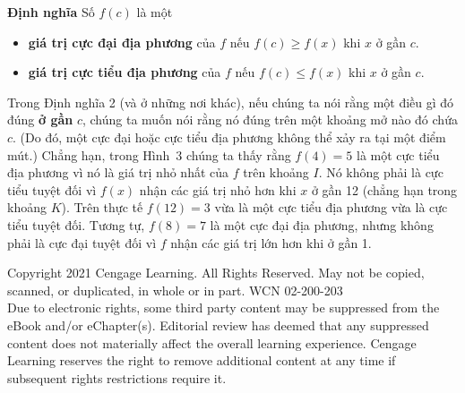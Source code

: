 \begin{minipage}[t]{131mm}
  \vspace{5pt}
  \begin{stewartbox}
  \noindent
  \hspace{6pt}%
  {\bfseries\sffamily\color{defred}\fontsize{10}{11}\selectfont Định nghĩa}\hspace{8pt}%
  Số $f(c)$ là một
  \begin{itemize}[leftmargin=1.5em, itemsep=2pt, topsep=3pt, parsep=0pt]
    \item[\textcolor{defred}{\textbullet}] \textbf{giá trị cực đại địa phương} của $f$ nếu $f(c) \geqslant f(x)$ khi $x$ ở gần $c$.
    \item[\textcolor{defred}{\textbullet}] \textbf{giá trị cực tiểu địa phương} của $f$ nếu $f(c) \leqslant f(x)$ khi $x$ ở gần $c$.
  \end{itemize}
  \end{stewartbox}

  \vspace{4pt}
  \noindent
  Trong Định nghĩa 2 (và ở những nơi khác), nếu chúng ta nói rằng một điều gì đó đúng \textbf{ở gần} $c$, chúng ta muốn nói rằng nó đúng trên một khoảng mở nào đó chứa $c$. (Do đó, một cực đại hoặc cực tiểu địa phương không thể xảy ra tại một điểm mút.) Chẳng hạn, trong Hình~3 chúng ta thấy rằng $f(4) = 5$ là một cực tiểu địa phương vì nó là giá trị nhỏ nhất của $f$ trên khoảng $I$. Nó không phải là cực tiểu tuyệt đối vì $f(x)$ nhận các giá trị nhỏ hơn khi $x$ ở gần 12 (chẳng hạn trong khoảng $K$). Trên thực tế $f(12) = 3$ vừa là một cực tiểu địa phương vừa là cực tiểu tuyệt đối. Tương tự, $f(8) = 7$ là một cực đại địa phương, nhưng không phải là cực đại tuyệt đối vì $f$ nhận các giá trị lớn hơn khi ở gần 1.
\end{minipage}

\vfill
\noindent
\begin{minipage}{\textwidth}
  \centering
  \fontsize{6.5}{8}\selectfont\color{gray!80!black}
  Copyright 2021 Cengage Learning. All Rights Reserved. May not be copied, scanned, or duplicated, in whole or in part. WCN 02-200-203\\[2pt]
  Due to electronic rights, some third party content may be suppressed from the eBook and/or eChapter(s). Editorial review has deemed that any suppressed content does not materially affect the overall learning experience. Cengage Learning reserves the right to remove additional content at any time if subsequent rights restrictions require it.
\end{minipage}
